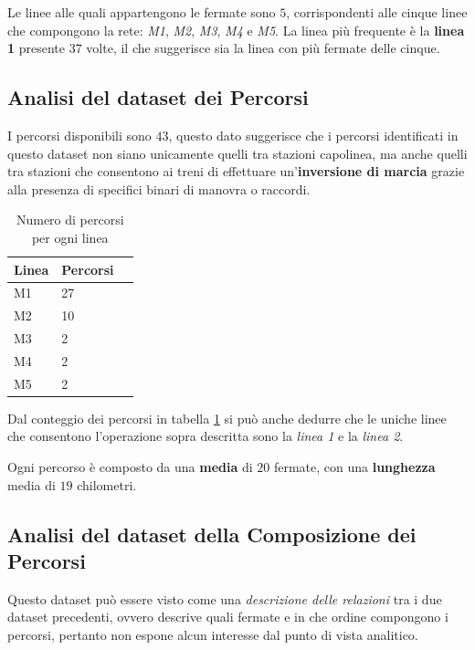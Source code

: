 Le linee alle quali appartengono le fermate sono $5$, corrispondenti alle cinque linee che compongono la rete: \textit{M1}, \textit{M2}, \textit{M3}, \textit{M4} e \textit{M5}. La linea più frequente è la \textbf{linea 1} presente $37$ volte,  il che suggerisce sia la linea con più fermate delle cinque.

\subsection{Analisi del dataset dei Percorsi}
I percorsi disponibili sono $43$, questo dato suggerisce che i percorsi identificati in questo dataset non siano unicamente quelli tra stazioni capolinea, ma anche quelli tra stazioni che consentono ai treni di effettuare un'\textbf{inversione di marcia} grazie alla presenza di specifici binari di manovra o raccordi.

\vspace{1.5em}
\begin{table}[h!]
\centering
\begin{tabular}{lll}
\hline
\textbf{Linea} & \textbf{Percorsi} \\
\hline
M1 & 27 \\
M2 & 10 \\
M3 & 2 \\
M4 & 2 \\
M5 & 2 \\
\hline
\end{tabular}
\caption{Numero di percorsi per ogni linea}
\label{tab:Numero di percorsi per ogni linea}
\end{table}
\vspace{1.5em}

Dal conteggio dei percorsi in tabella \ref{tab:Numero di percorsi per ogni linea} si può anche dedurre che le uniche linee che consentono l'operazione sopra descritta sono la \textit{linea 1} e la \textit{linea 2}.

Ogni percorso è composto da una \textbf{media} di $20$ fermate, con una \textbf{lunghezza} media di $19$ chilometri.

\subsection{Analisi del dataset della Composizione dei Percorsi}
Questo dataset può essere visto come una \textit{descrizione delle relazioni} tra i due dataset precedenti, ovvero descrive quali fermate e in che ordine compongono i percorsi, pertanto non espone alcun interesse dal punto di vista analitico.


